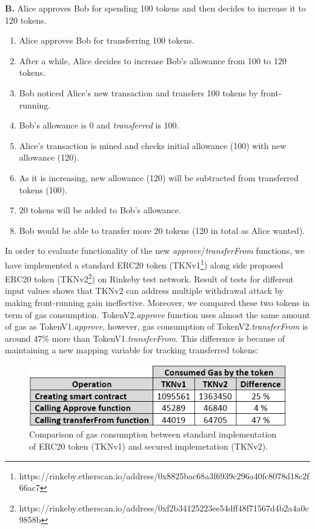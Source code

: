 \noindent \textbf{B.} Alice approves Bob for spending 100 tokens and then decides to increase it to 120 tokens.
\begin{enumerate}
	\item Alice approves Bob for transferring 100 tokens.
	\item After a while, Alice decides to increase Bob’s allowance from 100 to 120 tokens.
	\item Bob noticed Alice’s new transaction and transfers 100 tokens by front-running.
	\item Bob’s allowance is 0 and \textit{transferred} is 100.
	\item Alice’s transaction is mined and checks initial allowance (100) with new allowance (120).
	\item As it is increasing, new allowance (120) will be subtracted from transferred tokens (100).
	\item 20 tokens will be added to Bob’s allowance.
	\item Bob would be able to transfer more 20 tokens (120 in total as Alice wanted).\newline
\end{enumerate}
\noindent In order to evaluate functionality of the new \textit{approve}/\textit{transferFrom} functions, we have implemented a standard ERC20 token (TKNv1\footnote{https://rinkeby.etherscan.io/address/0x8825bac68a3f6939c296a40fc8078\newline d18c2f66ac7}) along side proposed ERC20 token (TKNv2\footnote{https://rinkeby.etherscan.io/address/0xf2b34125223ee54dff48f71567d4b\newline 2a4a0c9858b}) on Rinkeby test network. Result of tests for different input values shows that TKNv2 can address multiple withdrawal attack by making front-running gain ineffective. Moreover, we compared these two tokens in term of gas consumption. TokenV2.\textit{approve} function uses almost the same amount of gas as TokenV1.\textit{approve}, however, gas consumption of TokenV2.\textit{transferFrom} is around 47\% more than TokenV1.\textit{transferFrom}. This difference is because of maintaining a new mapping variable for tracking transferred tokens:
\begin{figure}[t]
	\centering
	\includegraphics[width=1.0\linewidth]{figures/multiple_withdrawal_22.png}
	\caption{Comparison of gas consumption between standard implementation of ERC20 token (TKNv1) and secured implemetation (TKNv2).}
\end{figure}
